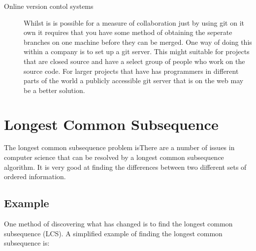 \begin{description}
  \item [Online version contol systems]  
  Whilst is is possible for a measure of collaboration just by using git on it own it requires that you have some method of obtaining the seperate branches on one machine before they can be merged.  One way of doing this within a company is to set up a git server.  This might suitable for projects that are closed source and have a select group of people who work on the source code.  For larger projects that have has programmers in different parts of the world a publicly accessible git server that is on the web may be a better solution.    

  
\end{description}

\section{Longest Common Subsequence}
The longest common subsequence problem isThere are a number of issues in computer science that can be resolved by a longest common subsequence algorithm.
It is very good at finding the differences between two different sets of ordered information.


\subsection{Example}
One method of discovering what has changed is to find the longest common subsequence (LCS).
A simplified example of finding the longest common subsequence is:

